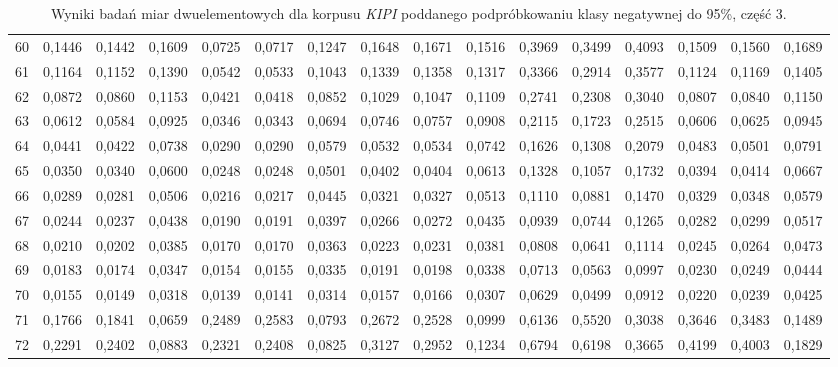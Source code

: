 \begin{table}[htp!]
\begin{adjustwidth}{-2cm}{}
\begin{tabular}{ l | *{15}{| r}}
60	&	0,1446	&	0,1442	&	0,1609	&	0,0725	&	0,0717	&	0,1247	&	0,1648	&	0,1671	&	0,1516	&	0,3969	&	0,3499	&	0,4093	&	0,1509	&	0,1560	&	0,1689	\\
61	&	0,1164	&	0,1152	&	0,1390	&	0,0542	&	0,0533	&	0,1043	&	0,1339	&	0,1358	&	0,1317	&	0,3366	&	0,2914	&	0,3577	&	0,1124	&	0,1169	&	0,1405	\\
62	&	0,0872	&	0,0860	&	0,1153	&	0,0421	&	0,0418	&	0,0852	&	0,1029	&	0,1047	&	0,1109	&	0,2741	&	0,2308	&	0,3040	&	0,0807	&	0,0840	&	0,1150	\\
63	&	0,0612	&	0,0584	&	0,0925	&	0,0346	&	0,0343	&	0,0694	&	0,0746	&	0,0757	&	0,0908	&	0,2115	&	0,1723	&	0,2515	&	0,0606	&	0,0625	&	0,0945	\\
64	&	0,0441	&	0,0422	&	0,0738	&	0,0290	&	0,0290	&	0,0579	&	0,0532	&	0,0534	&	0,0742	&	0,1626	&	0,1308	&	0,2079	&	0,0483	&	0,0501	&	0,0791	\\
65	&	0,0350	&	0,0340	&	0,0600	&	0,0248	&	0,0248	&	0,0501	&	0,0402	&	0,0404	&	0,0613	&	0,1328	&	0,1057	&	0,1732	&	0,0394	&	0,0414	&	0,0667	\\
66	&	0,0289	&	0,0281	&	0,0506	&	0,0216	&	0,0217	&	0,0445	&	0,0321	&	0,0327	&	0,0513	&	0,1110	&	0,0881	&	0,1470	&	0,0329	&	0,0348	&	0,0579	\\
67	&	0,0244	&	0,0237	&	0,0438	&	0,0190	&	0,0191	&	0,0397	&	0,0266	&	0,0272	&	0,0435	&	0,0939	&	0,0744	&	0,1265	&	0,0282	&	0,0299	&	0,0517	\\
68	&	0,0210	&	0,0202	&	0,0385	&	0,0170	&	0,0170	&	0,0363	&	0,0223	&	0,0231	&	0,0381	&	0,0808	&	0,0641	&	0,1114	&	0,0245	&	0,0264	&	0,0473	\\
69	&	0,0183	&	0,0174	&	0,0347	&	0,0154	&	0,0155	&	0,0335	&	0,0191	&	0,0198	&	0,0338	&	0,0713	&	0,0563	&	0,0997	&	0,0230	&	0,0249	&	0,0444	\\
70	&	0,0155	&	0,0149	&	0,0318	&	0,0139	&	0,0141	&	0,0314	&	0,0157	&	0,0166	&	0,0307	&	0,0629	&	0,0499	&	0,0912	&	0,0220	&	0,0239	&	0,0425	\\
71	&	0,1766	&	0,1841	&	0,0659	&	0,2489	&	0,2583	&	0,0793	&	0,2672	&	0,2528	&	0,0999	&	0,6136	&	0,5520	&	0,3038	&	0,3646	&	0,3483	&	0,1489	\\
72	&	0,2291	&	0,2402	&	0,0883	&	0,2321	&	0,2408	&	0,0825	&	0,3127	&	0,2952	&	0,1234	&	0,6794	&	0,6198	&	0,3665	&	0,4199	&	0,4003	&	0,1829	\\
	\bottomrule
\end{tabular}
 \end{adjustwidth}
\caption[Wyniki badań miar dwuelementowych dla korpusu \emph{KIPI} poddanego podpróbkowaniu klasy negatywnej do 95\%, część 3]{Wyniki badań miar dwuelementowych dla korpusu \emph{KIPI} poddanego podpróbkowaniu klasy negatywnej do 95\%, część 3.}
\label{KIPI_subsampled_5_part_3}
\end{table}


